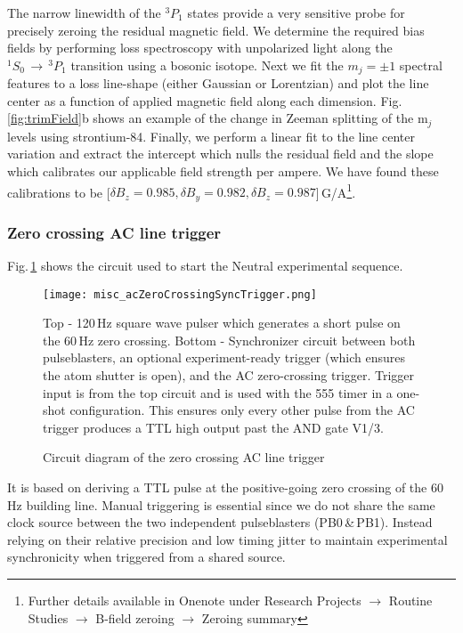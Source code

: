 The narrow linewidth of the $^3P_1$ states provide a very sensitive probe for precisely zeroing the residual magnetic field.
We determine the required bias fields by performing loss spectroscopy with unpolarized light along the $^1S_0\,\rightarrow\,^3P_1$ transition using a bosonic isotope.
Next we fit the $m_j=\pm1$ spectral features to a loss line-shape (either Gaussian or Lorentzian) and plot the line center as a function of applied magnetic field along each dimension.
Fig.\,\ref{fig:trimField}b shows an example of the change in Zeeman splitting of the m$_j$ levels using strontium-84.
Finally, we perform a linear fit to the line center variation and extract the intercept which nulls the residual field and the slope which calibrates our applicable field strength per ampere. 
We have found these calibrations to be [$\delta B_z = 0.985, \delta B_y = 0.982, \delta B_z = 0.987$]\,G/A\footnote{Further details available in Onenote under Research Projects $\rightarrow$ Routine Studies $\rightarrow$ B-field zeroing $\rightarrow$ Zeroing summary}.

\subsubsection{Zero crossing AC line trigger} \label{sec:expTrig}
Fig.\,\ref{fig:zeroCrossTrig} shows the circuit used to start the Neutral experimental sequence.
	\begin{figure}
		\centerline{
		\texttt{[image: misc\_acZeroCrossingSyncTrigger.png]}}
		\caption{Circuit diagram of the zero crossing AC line trigger}{Top - 120\,Hz square wave pulser which generates a short pulse on the 60\,Hz zero crossing. Bottom - Synchronizer circuit between both pulseblasters, an optional experiment-ready trigger (which ensures the atom shutter is open), and the AC zero-crossing trigger. Trigger input is from the top circuit and is used with the 555 timer in a one-shot configuration. This ensures only every other pulse from the AC trigger produces a TTL high output past the AND gate V1/3.}
		\label{fig:zeroCrossTrig}
	\end{figure} 
It is based on deriving a TTL pulse at the positive-going zero crossing of the 60\,Hz building line.
Manual triggering is essential since we do not share the same clock source between the two independent pulseblasters (PB0\,\&\,PB1).
Instead relying on their relative precision and low timing jitter to maintain experimental synchronicity when triggered from a shared source.

